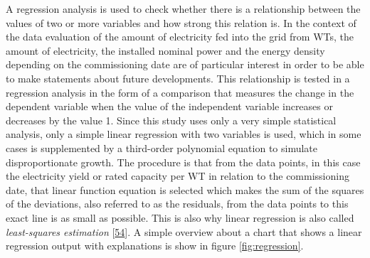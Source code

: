 \documentclass[a4paper,11pt]{article}
\begin{document}
A regression analysis is used to check whether there is a relationship between the values of two or more variables and how strong this relation is. In the context of the data evaluation of the amount of electricity fed into the grid from WTs, the amount of electricity, the installed nominal power and the energy density depending on the commissioning date are of particular interest in order to be able to make statements about future developments. This relationship is tested in a regression analysis in the form of a comparison that measures the change in the dependent variable when the value of the independent variable increases or decreases by the value 1. Since this study uses only a very simple statistical analysis, only a simple linear regression with two variables is used, which in some cases is supplemented by a third-order polynomial equation to simulate disproportionate growth. The procedure is that from the data points, in this case the electricity yield or rated capacity per WT in relation to the commissioning date, that linear function equation is selected which makes the sum of the squares of the deviations, also referred to as the residuals, from the data points to this exact line is as small as possible. This is also why linear regression is also called \emph{least-squares estimation} {[}\protect\hyperlink{ref-NormanMatloff.2017}{54}{]}. A simple overview about a chart that shows a linear regression output with explanations is show in figure \ref{fig:regression}.
\end{document}
